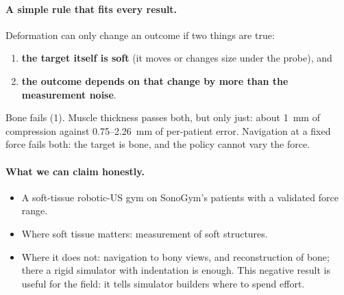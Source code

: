 \documentclass[10pt,a4paper,twocolumn]{article}
\begin{document}
\paragraph{A simple rule that fits every result.} Deformation can only change an outcome if two things are true:
\begin{enumerate}
  \item \textbf{the target itself is soft} (it moves or changes size under the probe), and
  \item \textbf{the outcome depends on that change by more than the measurement noise}.
\end{enumerate}
Bone fails (1). Muscle thickness passes both, but only just: about 1~mm of compression against 0.75--2.26~mm of
per-patient error. Navigation at a fixed force fails both: the target is bone, and the policy cannot vary the force.

\paragraph{What we can claim honestly.}
\begin{itemize}
  \item A soft-tissue robotic-US gym on SonoGym's patients with a validated force range.
  \item Where soft tissue matters: measurement of soft structures.
  \item Where it does not: navigation to bony views, and reconstruction of bone; there a rigid simulator with
    indentation is enough. This negative result is useful for the field: it tells simulator builders where to spend
    effort.
\end{itemize}

\end{document}
